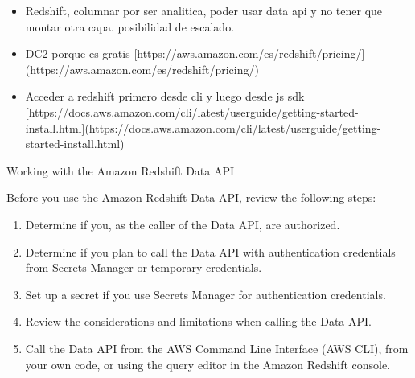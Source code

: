 

\begin{itemize}
    \item Redshift, columnar por ser analitica, poder usar data api y no tener que montar otra capa. posibilidad de escalado.
    \item DC2 porque es gratis [https://aws.amazon.com/es/redshift/pricing/](https://aws.amazon.com/es/redshift/pricing/)
    \item Acceder a redshift primero desde cli y luego desde js sdk [https://docs.aws.amazon.com/cli/latest/userguide/getting-started-install.html](https://docs.aws.amazon.com/cli/latest/userguide/getting-started-install.html)
\end{itemize}

Working with the Amazon Redshift Data API

Before you use the Amazon Redshift Data API, review the following steps:

\begin{enumerate}
    \item Determine if you, as the caller of the Data API, are authorized. 
    \item Determine if you plan to call the Data API with authentication credentials from Secrets Manager or temporary credentials. 
    \item Set up a secret if you use Secrets Manager for authentication credentials. 
    \item Review the considerations and limitations when calling the Data API. 
    \item Call the Data API from the AWS Command Line Interface (AWS CLI), from your own code, or using the query editor in the Amazon Redshift console.
\end{enumerate}
